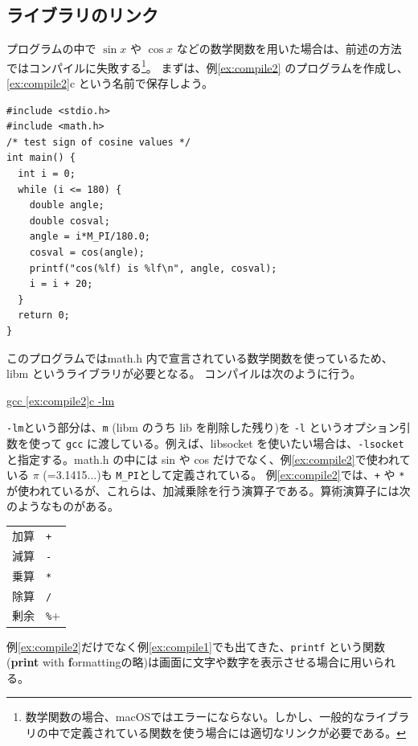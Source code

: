 \subsection{ライブラリのリンク}
プログラムの中で $\sin x$ や $\cos x$ などの数学関数を用いた場合は、前述の方法ではコンパイルに失敗する\footnote{数学関数の場合、macOSではエラーにならない。しかし、一般的なライブラリの中で定義されている関数を使う場合には適切なリンクが必要である。}。
まずは、例\ref{ex:compile2} のプログラムを作成し、\ref{ex:compile2}c という名前で保存しよう。
\begin{reidai}\label{ex:compile2}
\begin{verbatim}
#include <stdio.h>
#include <math.h>
/* test sign of cosine values */
int main() {
  int i = 0;
  while (i <= 180) {
    double angle;
    double cosval;
    angle = i*M_PI/180.0;
    cosval = cos(angle);
    printf("cos(%lf) is %lf\n", angle, cosval);
    i = i + 20;
  }
  return 0;
}
\end{verbatim}
\end{reidai} \noindent
このプログラムではmath.h 内で宣言されている数学関数を使っているため、libm というライブラリが必要となる。
コンパイルは次のように行う。
\begin{commandline2}
\prompt \underline{gcc \ref{ex:compile2}c -lm}
\end{commandline2} \noindent
\verb+-lm+という部分は、\verb+m+ (libm のうち lib を削除した残り)を \verb+-l+ というオプション引数を使って \verb+gcc+ に渡している。例えば、libsocket を使いたい場合は、\verb+-lsocket+ と指定する。math.h の中には sin や cos だけでなく、例\ref{ex:compile2}で使われている $\pi$ (=3.1415...)も \verb+M_PI+として定義されている。
例\ref{ex:compile2}では、\verb|+| や \verb+*+ が使われているが、これらは、加減乗除を行う演算子である。算術演算子には次のようなものがある。
\begin{table}[H]
\begin{center}
\begin{tabular}{ll}
  加算 & \verb|+| \\
  減算 & \verb+-+ \\
  乗算 & \verb+*+ \\
  除算 & \verb+/+ \\
  剰余 & \verb+%+
\end{tabular}
\end{center}
\end{table} \noindent
例\ref{ex:compile2}だけでなく例\ref{ex:compile1}でも出てきた、\verb+printf+ という関数(\textbf{print} with \textbf{f}ormattingの略)は画面に文字や数字を表示させる場合に用いられる。
